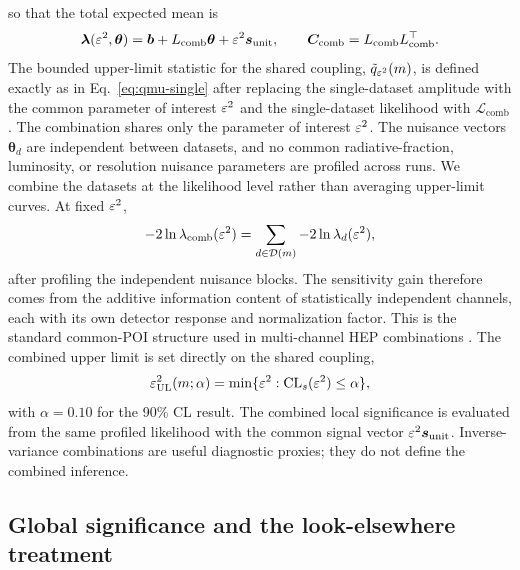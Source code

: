 so that the total expected mean is
\begin{equation}
\bm{\lambda}(\varepsilon^2,\bm{\theta})
= \bm{b} + L_{\mathrm{comb}}\bm{\theta} + \varepsilon^2\bm{s}_{\mathrm{unit}},
\qquad
\bm{C}_{\mathrm{comb}} = L_{\mathrm{comb}}L_{\mathrm{comb}}^\top.
\end{equation}
The bounded upper-limit statistic for the shared coupling,
$\tilde q_{\varepsilon^2}(m)$, is defined exactly as in Eq.~\eqref{eq:qmu-single} after
replacing the single-dataset amplitude with the common parameter of interest
$\varepsilon^2$ and the single-dataset likelihood with
$\mathcal{L}_{\mathrm{comb}}$. The combination shares only the parameter of interest
$\varepsilon^2$. The nuisance vectors
$\bm{\theta}_d$ are independent between datasets, and no common radiative-fraction,
luminosity, or resolution nuisance parameters are profiled across runs. We combine the
datasets at the likelihood level rather than averaging upper-limit curves. At fixed
$\varepsilon^2$,
\begin{equation}
-2\ln\lambda_{\mathrm{comb}}(\varepsilon^2)
=
\sum_{d \in \mathcal{D}(m)} -2\ln\lambda_d(\varepsilon^2),
\end{equation}
after profiling the independent nuisance blocks. The sensitivity gain therefore comes
from the additive information content of statistically independent channels, each with
its own detector response and normalization factor. This is the standard common-POI structure used
in multi-channel HEP combinations \cite{HistFactory,ATLASCMSHiggs2016}. The combined
upper limit is set directly on the shared coupling,
\begin{equation}
\varepsilon^2_{\mathrm{UL}}(m;\alpha)
= \min\{\varepsilon^2 : \mathrm{CL}_s(\varepsilon^2)\le\alpha\},
\end{equation}
with $\alpha=0.10$ for the 90\% CL result. The combined local significance is
evaluated from the same profiled likelihood
with the common signal vector $\varepsilon^2 \bm{s}_{\mathrm{unit}}$. Inverse-variance
combinations are useful diagnostic proxies; they do not define the combined inference.

\subsection{Global significance and the look-elsewhere treatment}

